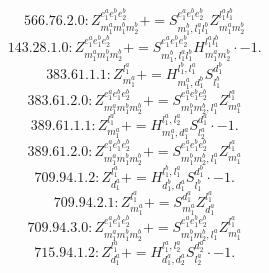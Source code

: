 \documentclass[letterpaper,10pt,fleqn,leqno,onecolumn]{article}
\begin{document}
\begin{equation} \;\;\;\;\;\;  566.76.2.0: Z^{e_{1}^{a}e_{1}^{b}e_{2}^{b}}_{m_{1}^{a}m_{1}^{b}m_{2}^{b}}+=S^{e_{1}^{a}e_{1}^{b}e_{2}^{b}}_{m_{1}^{b},l_{1}^{a}l_{1}^{b}}Z^{l_{1}^{a}l_{1}^{b}}_{m_{1}^{a}m_{2}^{b}} \end{equation}
\begin{equation} \;\;\;\;\;\;  143.28.1.0: Z^{e_{1}^{a}e_{1}^{b}e_{2}^{b}}_{m_{1}^{a}m_{1}^{b}m_{2}^{b}}+=S^{e_{1}^{a}e_{1}^{b}e_{2}^{b}}_{m_{1}^{b},l_{1}^{a}l_{1}^{b}}H^{l_{1}^{a}l_{1}^{b}}_{m_{1}^{a}m_{2}^{b}}\cdot -1. \end{equation}
\begin{equation} \;\;\;\;\;\;  383.61.1.1: Z^{l_{1}^{a}}_{m_{1}^{a}}+=H^{l_{1}^{b},l_{1}^{a}}_{m_{1}^{a},d_{1}^{b}}S^{d_{1}^{b}}_{l_{1}^{b}} \end{equation}
\begin{equation} \;\;\;\;\;\;  383.61.2.0: Z^{e_{1}^{a}e_{1}^{b}e_{2}^{b}}_{m_{1}^{a}m_{1}^{b}m_{2}^{b}}+=S^{e_{1}^{a}e_{1}^{b}e_{2}^{b}}_{m_{1}^{b}m_{2}^{b},l_{1}^{a}}Z^{l_{1}^{a}}_{m_{1}^{a}} \end{equation}
\begin{equation} \;\;\;\;\;\;  389.61.1.1: Z^{l_{1}^{a}}_{m_{1}^{a}}+=H^{l_{1}^{a},l_{2}^{a}}_{m_{1}^{a},d_{1}^{a}}S^{d_{1}^{a}}_{l_{2}^{a}}\cdot -1. \end{equation}
\begin{equation} \;\;\;\;\;\;  389.61.2.0: Z^{e_{1}^{a}e_{1}^{b}e_{2}^{b}}_{m_{1}^{a}m_{1}^{b}m_{2}^{b}}+=S^{e_{1}^{a}e_{1}^{b}e_{2}^{b}}_{m_{1}^{b}m_{2}^{b},l_{1}^{a}}Z^{l_{1}^{a}}_{m_{1}^{a}} \end{equation}
\begin{equation} \;\;\;\;\;\;  709.94.1.2: Z^{l_{1}^{a}}_{d_{1}^{a}}+=H^{l_{1}^{b},l_{1}^{a}}_{d_{1}^{b},d_{1}^{a}}S^{d_{1}^{b}}_{l_{1}^{b}}\cdot -1. \end{equation}
\begin{equation} \;\;\;\;\;\;  709.94.2.1: Z^{l_{1}^{a}}_{m_{1}^{a}}+=S^{d_{1}^{a}}_{m_{1}^{a}}Z^{l_{1}^{a}}_{d_{1}^{a}} \end{equation}
\begin{equation} \;\;\;\;\;\;  709.94.3.0: Z^{e_{1}^{a}e_{1}^{b}e_{2}^{b}}_{m_{1}^{a}m_{1}^{b}m_{2}^{b}}+=S^{e_{1}^{a}e_{1}^{b}e_{2}^{b}}_{m_{1}^{b}m_{2}^{b},l_{1}^{a}}Z^{l_{1}^{a}}_{m_{1}^{a}} \end{equation}
\begin{equation} \;\;\;\;\;\;  715.94.1.2: Z^{l_{1}^{a}}_{d_{1}^{a}}+=H^{l_{1}^{a},l_{2}^{a}}_{d_{1}^{a},d_{2}^{a}}S^{d_{2}^{a}}_{l_{2}^{a}}\cdot -1. \end{equation}
\end{document}
